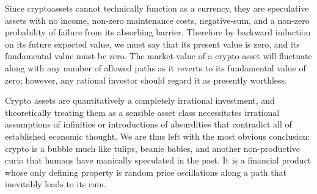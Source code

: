 Since cryptoassets cannot technically function as a currency, they are
speculative assets with no income, non-zero maintenance costs, negative-sum, and
a non-zero probability of failure from its absorbing barrier. Therefore by
backward induction on its future expected value, we must say that its present
value is zero, and its fundamental value must be zero. The market value of a
crypto asset will fluctuate along with any number of allowed paths as it reverts
to its fundamental value of zero; however, any rational investor should regard
it as presently worthless.

Crypto assets are quantitatively a completely irrational investment, and
theoretically treating them as a sensible asset class necessitates irrational
assumptions of infinities or introductions of absurdities that contradict all of
established economic thought. We are thus left with the most obvious conclusion:
crypto is a bubble much like tulips, beanie babies, and another non-productive
curio that humans have manically speculated in the past. It is a financial
product whose only defining property is random price oscillations along a path
that inevitably leads to its ruin.
